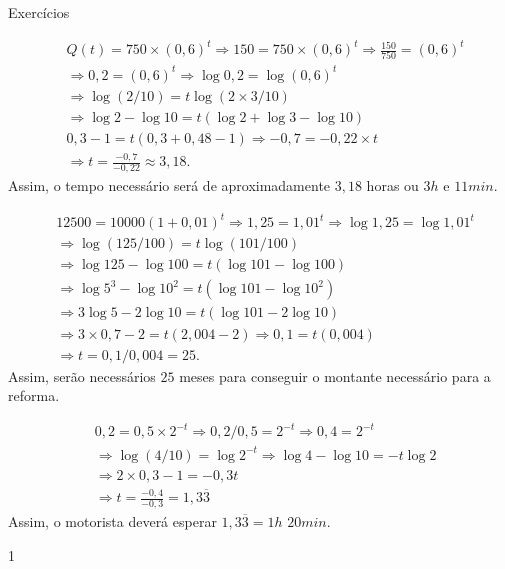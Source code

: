 \begin{answer}{Exercícios}
{	
	\exerciselist
	\begin{enumerate}\setcounter{enumi}{4}
		\Item
		\begin{align*}
		&Q(t) = 750 \times (0{,}6)^t\Rightarrow 150 = 750 \times (0{,}6)^t\Rightarrow \frac{150}{750} = (0{,}6)^t\\
		& \Rightarrow 0{,}2= (0{,}6)^t \Rightarrow\log 0{,}2= \log (0{,}6)^t\\
		& \Rightarrow \log (2/10)= t \log(2\times 3 / 10) \\
		& \Rightarrow \log 2 - \log 10= t (\log 2 +\log 3 - \log 10)\\
		& 0{,}3 -1 = t(0{,}3+0{,}48-1) \Rightarrow-0{,}7 = -0{,}22 \times t\\
		&\Rightarrow t=\frac{-0{,}7}{-0{,}22}\approx 3{,}18. 
		\end{align*}
		Assim, o tempo necessário será de aproximadamente $3{,}18$ horas ou $3h$ e $11min$.

		\Item
		\begin{align*}
		&12500 = 10000(1+0{,}01)^t\Rightarrow 1{,}25 = 1{,}01^t\Rightarrow \log 1{,}25 = \log 1{,}01^t\\
		&\Rightarrow \log (125/100) = t\log (101/100)\\
		&\Rightarrow \log 125 -\log 100 = t(\log 101 -\log 100)\\
		&\Rightarrow \log 5^3 -\log 10^2 = t(\log 101 -\log 10^2)\\
		&\Rightarrow 3\log 5 -2\log 10 = t(\log 101 -2\log 10)\\
		&\Rightarrow 3\times0{,}7 -2 = t(2{,}004 -2)\Rightarrow 0{,}1 = t(0{,}004)\\
		&\Rightarrow t = 0{,}1/0{,}004 = 25.
		\end{align*}
		Assim, serão necessários $25$ meses para conseguir o montante necessário para a reforma.

		\Item
		\begin{align*}
		&0{,}2 = 0{,}5 \times 2^{-t}\Rightarrow 0{,}2/0{,}5 = 2^{-t}\Rightarrow 0{,}4 = 2^{-t}\\
		&\Rightarrow \log (4/10) =\log 2^{-t}\Rightarrow \log 4- \log 10 = -t \log 2 \\
		&\Rightarrow 2 \times 0{,}3 - 1 = -0{,}3 t\\
		&\Rightarrow t= \frac{-0{,}4}{-0{,}3} = 1{,}3\overline{3}
		\end{align*}
		Assim, o motorista deverá esperar $1{,}3\overline{3} = 1h$ $20min$.
	\end{enumerate}
}{1}
\end{answer}
\exercise


